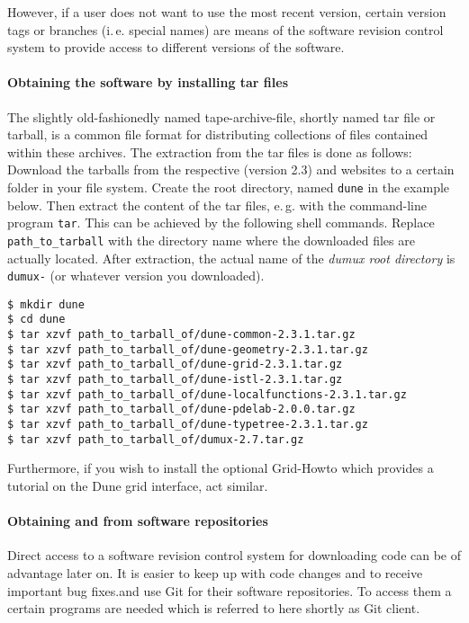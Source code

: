 However, if a user does not want to use the most recent version,
certain version tags or branches (i.\,e. special names) are means
of the software revision control system to provide access to different versions of the software.

\paragraph{Obtaining the software by installing tar files}
The slightly old-fashionedly named tape-archive-file, shortly named tar file or
tarball, is a common file format for distributing collections of files contained
within these archives.
The extraction from the tar files is done as follows:
Download the tarballs from the respective \Dune (version 2.3) and \Dumux websites
to a certain folder in your file system.
Create the {\Dune} root directory, named \texttt{dune} in the example below.
Then extract the content of the tar files, e.\,g. with the command-line program
\texttt{tar}.
This can be achieved by the following shell commands. Replace \texttt{path\_to\_tarball}
with the directory name where the downloaded files are actually located.
After extraction, the actual name of the \emph{dumux root directory} is \texttt{dumux-\DumuxVersion}
(or whatever version you downloaded).

\begin{lstlisting}[style=Bash]
$ mkdir dune
$ cd dune
$ tar xzvf path_to_tarball_of/dune-common-2.3.1.tar.gz
$ tar xzvf path_to_tarball_of/dune-geometry-2.3.1.tar.gz
$ tar xzvf path_to_tarball_of/dune-grid-2.3.1.tar.gz
$ tar xzvf path_to_tarball_of/dune-istl-2.3.1.tar.gz
$ tar xzvf path_to_tarball_of/dune-localfunctions-2.3.1.tar.gz
$ tar xzvf path_to_tarball_of/dune-pdelab-2.0.0.tar.gz
$ tar xzvf path_to_tarball_of/dune-typetree-2.3.1.tar.gz
$ tar xzvf path_to_tarball_of/dumux-2.7.tar.gz
\end{lstlisting}

Furthermore, if you wish to install the optional \Dune Grid-Howto which provides a tutorial
on the Dune grid interface, act similar.

\paragraph{Obtaining \Dune and \Dumux from software repositories}
Direct access to a software revision control system for downloading code can be of advantage later on.
It is easier to keep up with code changes and to receive important bug fixes.\Dune and \Dumux use
Git for their software repositories. To access them a certain programs are needed which
is referred to here shortly as Git client.

